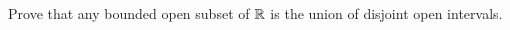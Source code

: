 \begin{problem}
  Prove that any bounded open subset of $\mathbb{R}$
  is the union of disjoint open intervals.
\end{problem}

\begin{answer}

\end{answer}
